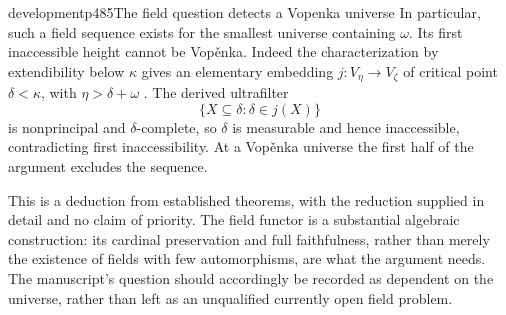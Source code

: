 \begin{dcomment}{development}{p485}{The field question detects a Vopenka universe}
In particular, such a field sequence exists for the smallest universe containing $\omega$. Its first inaccessible height cannot be Vop\v{e}nka. Indeed the characterization by extendibility below $\kappa$ gives an elementary embedding $j:V_\eta\to V_\zeta$ of critical point $\delta<\kappa$, with $\eta>\delta+\omega$ \citep[Proposition~7]{BrookeTaylor2011Vopenka}. The derived ultrafilter
\[
\{X\subseteq\delta:\delta\in j(X)\}
\]
is nonprincipal and $\delta$-complete, so $\delta$ is measurable and hence inaccessible, contradicting first inaccessibility. At a Vop\v{e}nka universe the first half of the argument excludes the sequence.

This is a deduction from established theorems, with the reduction supplied in detail and no claim of priority. The field functor is a substantial algebraic construction: its cardinal preservation and full faithfulness, rather than merely the existence of fields with few automorphisms, are what the argument needs. The manuscript's question should accordingly be recorded as dependent on the universe, rather than left as an unqualified currently open field problem.
\end{dcomment}

